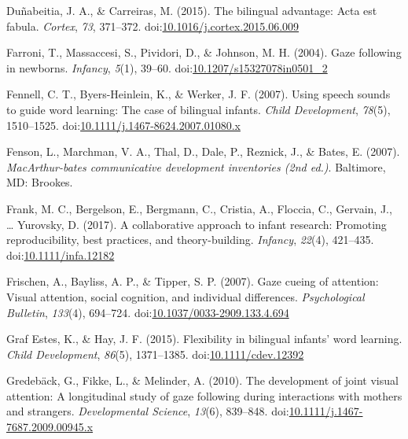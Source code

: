 \documentclass[,man,floatsintext]{apa6}
\begin{document}
\leavevmode\hypertarget{ref-Dunabeitia_Carreiras_2015}{}%
Duñabeitia, J. A., \& Carreiras, M. (2015). The bilingual advantage: Acta est fabula. \emph{Cortex}, \emph{73}, 371--372. doi:\href{https://doi.org/10.1016/j.cortex.2015.06.009}{10.1016/j.cortex.2015.06.009}

\leavevmode\hypertarget{ref-Farroni_etal_2004}{}%
Farroni, T., Massaccesi, S., Pividori, D., \& Johnson, M. H. (2004). Gaze following in newborns. \emph{Infancy}, \emph{5}(1), 39--60. doi:\href{https://doi.org/10.1207/s15327078in0501_2}{10.1207/s15327078in0501\_2}

\leavevmode\hypertarget{ref-Fennell_etal_2007}{}%
Fennell, C. T., Byers-Heinlein, K., \& Werker, J. F. (2007). Using speech sounds to guide word learning: The case of bilingual infants. \emph{Child Development}, \emph{78}(5), 1510--1525. doi:\href{https://doi.org/10.1111/j.1467-8624.2007.01080.x}{10.1111/j.1467-8624.2007.01080.x}

\leavevmode\hypertarget{ref-Fenson_etal_2007}{}%
Fenson, L., Marchman, V. A., Thal, D., Dale, P., Reznick, J., \& Bates, E. (2007). \emph{MacArthur-bates communicative development inventories (2nd ed.)}. Baltimore, MD: Brookes.

\leavevmode\hypertarget{ref-Frank_etal_2017}{}%
Frank, M. C., Bergelson, E., Bergmann, C., Cristia, A., Floccia, C., Gervain, J., \ldots{} Yurovsky, D. (2017). A collaborative approach to infant research: Promoting reproducibility, best practices, and theory-building. \emph{Infancy}, \emph{22}(4), 421--435. doi:\href{https://doi.org/10.1111/infa.12182}{10.1111/infa.12182}

\leavevmode\hypertarget{ref-Frischen_etal_2007}{}%
Frischen, A., Bayliss, A. P., \& Tipper, S. P. (2007). Gaze cueing of attention: Visual attention, social cognition, and individual differences. \emph{Psychological Bulletin}, \emph{133}(4), 694--724. doi:\href{https://doi.org/10.1037/0033-2909.133.4.694}{10.1037/0033-2909.133.4.694}

\leavevmode\hypertarget{ref-GrafEstes_Hay_2015}{}%
Graf Estes, K., \& Hay, J. F. (2015). Flexibility in bilingual infants' word learning. \emph{Child Development}, \emph{86}(5), 1371--1385. doi:\href{https://doi.org/10.1111/cdev.12392}{10.1111/cdev.12392}

\leavevmode\hypertarget{ref-Gredeback_etal_2010}{}%
Gredebäck, G., Fikke, L., \& Melinder, A. (2010). The development of joint visual attention: A longitudinal study of gaze following during interactions with mothers and strangers. \emph{Developmental Science}, \emph{13}(6), 839--848. doi:\href{https://doi.org/10.1111/j.1467-7687.2009.00945.x}{10.1111/j.1467-7687.2009.00945.x}
\end{document}
